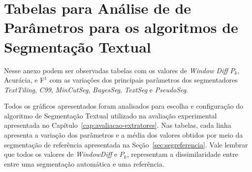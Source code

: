 \chapter{ Tabelas para Análise de de Parâmetros para os algoritmos de Segmentação Textual }\label{apendice1}


Nesse anexo podem ser observadas tabelas com os valores de \textit{Window Diff} $P_k$, Acurácia, e F$^1$ com as variações dos principais parâmetros dos segmentadores \textit{TextTiling}, \textit{C99}, \textit{MinCutSeg}, \textit{BayesSeg}, \textit{TextSeg} e \textit{PseudoSeg}.

Todos os gráficos apresentados foram analisados para escolha e configuração do algoritmo de Segmentação Textual utilizado na avaliação experimental apresentada no Capítulo~\ref{cap:avaliacao-extratores}. 
Nas tabelas, cada linha apresenta a variação dos parâmetros e a média dos valores obtidos por meio da segmentação de referência apresentada na Seção~\ref{sec:segreferencia}. Vale lembrar que todos os valores de \textit{WindowDiff} e $P_k$, representam a dissimilaridade entre entre uma segmentação automática e uma referência. 


% 
% 
